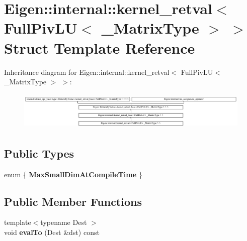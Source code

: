 \hypertarget{struct_eigen_1_1internal_1_1kernel__retval_3_01_full_piv_l_u_3_01___matrix_type_01_4_01_4}{}\section{Eigen\+::internal\+::kernel\+\_\+retval$<$ Full\+Piv\+LU$<$ \+\_\+\+Matrix\+Type $>$ $>$ Struct Template Reference}
\label{struct_eigen_1_1internal_1_1kernel__retval_3_01_full_piv_l_u_3_01___matrix_type_01_4_01_4}
Inheritance diagram for Eigen\+::internal\+::kernel\+\_\+retval$<$ Full\+Piv\+LU$<$ \+\_\+\+Matrix\+Type $>$ $>$\+:\begin{figure}[H]
\begin{center}
\leavevmode
\includegraphics[height=1.854305cm]{struct_eigen_1_1internal_1_1kernel__retval_3_01_full_piv_l_u_3_01___matrix_type_01_4_01_4}
\end{center}
\end{figure}
\subsection*{Public Types}
\begin{DoxyCompactItemize}
\item 
\mbox{\label{struct_eigen_1_1internal_1_1kernel__retval_3_01_full_piv_l_u_3_01___matrix_type_01_4_01_4_a14b0721440a01e349c26c2bddc1f0c1b}} 
enum \{ {\bfseries Max\+Small\+Dim\+At\+Compile\+Time}
 \}
\end{DoxyCompactItemize}
\subsection*{Public Member Functions}
\begin{DoxyCompactItemize}
\item 
\mbox{\label{struct_eigen_1_1internal_1_1kernel__retval_3_01_full_piv_l_u_3_01___matrix_type_01_4_01_4_a1e8b6aafb22358f65a436cff4c3ed9b4}} 
{\footnotesize template$<$typename Dest $>$ }\\void {\bfseries eval\+To} (Dest \&dst) const
\end{DoxyCompactItemize}
